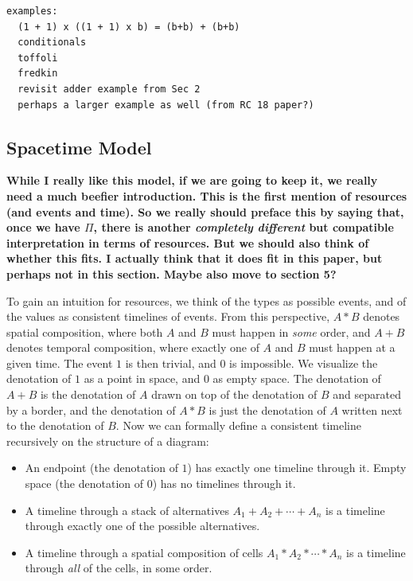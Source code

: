 \documentclass{article}
\newcommand{\jc}[1]{\fbox{Jacques says:} \textbf{#1}}
\begin{document}
\begin{verbatim}
examples:
  (1 + 1) x ((1 + 1) x b) = (b+b) + (b+b)
  conditionals
  toffoli
  fredkin
  revisit adder example from Sec 2
  perhaps a larger example as well (from RC 18 paper?)
\end{verbatim}

\subsection{Spacetime Model}
\jc{While I really like this model, if we are going to keep it, we
really need a much beefier introduction. This is the first mention of
resources (and events and time). So we really should preface this by
saying that, once we have $\Pi$, there is another \emph{completely
different} but compatible interpretation in terms of resources. But
we should also think of whether this fits. I actually think that it
does fit in this paper, but perhaps not in this section. Maybe
also move to section 5?}

To gain an intuition for resources, we think of the types as possible
events, and of the values as consistent timelines of events. From this
perspective, $A * B$ denotes spatial composition, where both $A$ and
$B$ must happen in \emph{some} order, and $A + B$ denotes temporal
composition, where exactly one of $A$ and $B$ must happen at a given
time. The event $1$ is then trivial, and $0$ is impossible.  We
visualize the denotation of $1$ as a point in space, and $0$ as empty
space. The denotation of $A + B$ is the denotation of $A$ drawn on top
of the denotation of $B$ and separated by a border, and the denotation
of $A * B$ is just the denotation of $A$ written next to the
denotation of $B$. Now we can formally define a consistent timeline
recursively on the structure of a diagram:

\begin{itemize}
\item An endpoint (the denotation of $1$) has exactly one timeline
  through it.  Empty space (the denotation of $0$) has no timelines
  through it.
\item A timeline through a stack of alternatives
  $A_1 + A_2 + \cdots + A_n$ is a timeline through exactly one of the
  possible alternatives.
\item A timeline through a spatial composition of cells
  $A_1 * A_2 * \cdots * A_n$ is a timeline through \emph{all} of the
  cells, in some order.
\end{itemize}
\end{document}
